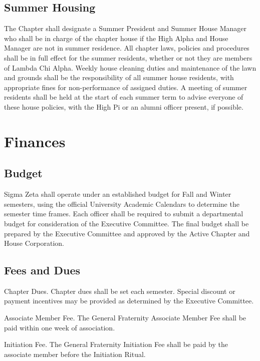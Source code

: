 \documentclass{article}
\begin{document}
\subsection{Summer Housing}

The Chapter shall designate a Summer President and Summer House Manager who
shall be in charge of the chapter house if the High Alpha and House Manager are
not in summer residence. All chapter laws, policies and procedures shall be in
full effect for the summer residents, whether or not they are members of Lambda
Chi Alpha. Weekly house cleaning duties and maintenance of the lawn and grounds
shall be the responsibility of all summer house residents, with appropriate
fines for non-performance of assigned duties. A meeting of summer residents
shall be held at the start of each summer term to advise everyone of these house
policies, with the High Pi or an alumni officer present, if possible.

\section{Finances}

\subsection{Budget}

Sigma Zeta shall operate under an established budget for Fall and Winter
semesters, using the official University Academic Calendars to determine the
semester time frames. Each officer shall be required to submit a departmental
budget for consideration of the Executive Committee. The final budget shall be
prepared by the Executive Committee and approved by the Active Chapter and House
Corporation.

\subsection{Fees and Dues}

\begin{subsubsectionList}
  \item {\titleStyle Chapter Dues.}
  Chapter dues shall be set each semester. Special discount or payment
  incentives may be provided as determined by the Executive Committee.

  \pagebreak

  \item {\titleStyle Associate Member Fee.}
  The General Fraternity Associate Member Fee shall be paid within one week of
  association.

  \item {\titleStyle Initiation Fee.}
  The General Fraternity Initiation Fee shall be paid by the associate member
  before the Initiation Ritual.
\end{subsubsectionList}
\end{document}

